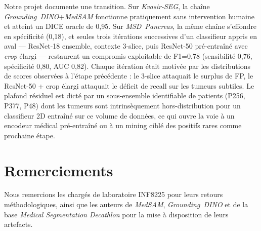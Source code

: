 \documentclass{article}
\begin{document}
Notre projet documente une transition. Sur \emph{Kvasir-SEG}, la cha\^ine
\emph{Grounding~DINO}+\emph{MedSAM} fonctionne pratiquement sans intervention
humaine et atteint un DICE oracle de 0{,}95. Sur \emph{MSD~Pancreas}, la
m\^eme cha\^ine s'effondre en sp\'ecificit\'e (0{,}18), et seules trois
it\'erations successives d'un classifieur appris en aval --- ResNet-18
ensemble, contexte 3-slice, puis ResNet-50 pr\'e-entra\^in\'e avec
\emph{crop} \'elargi --- restaurent un compromis exploitable de F1=0{,}78
(sensibilit\'e 0{,}76, sp\'ecificit\'e 0{,}80, AUC 0{,}82). Chaque it\'eration
\'etait motiv\'ee par les distributions de scores observ\'ees \`a l'\'etape
pr\'ec\'edente : le 3-slice attaquait le surplus de FP, le ResNet-50 + crop
\'elargi attaquait le d\'eficit de recall sur les tumeurs subtiles. Le
plafond r\'esiduel est dict\'e par un sous-ensemble identifiable de patients
(P256, P377, P48) dont les tumeurs sont intrins\`equement hors-distribution
pour un classifieur 2D entra\^in\'e sur ce volume de donn\'ees, ce qui
ouvre la voie \`a un encodeur m\'edical pr\'e-entra\^in\'e ou \`a un mining
cibl\'e des positifs rares comme prochaine \'etape.

\section*{Remerciements}

Nous remercions les charg\'es de laboratoire INF8225 pour leurs retours
m\'ethodologiques, ainsi que les auteurs de \emph{MedSAM},
\emph{Grounding~DINO} et de la base \emph{Medical Segmentation Decathlon}
pour la mise \`a disposition de leurs artefacts.



\end{document}
